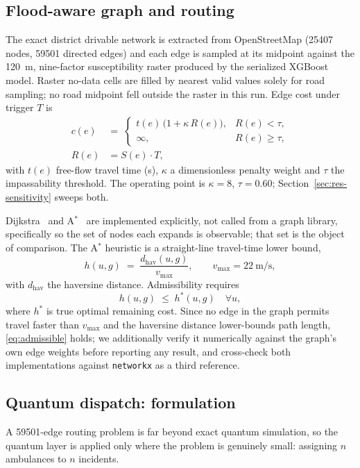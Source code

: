 \documentclass[10pt,twocolumn]{article}
\begin{document}
\subsection{Flood-aware graph and routing}
\label{sec:method-routing}
The exact district drivable network is extracted from OpenStreetMap
(\num{25407} nodes, \num{59501} directed edges) and each edge is sampled at its
midpoint against the \SI{120}{\metre}, nine-factor susceptibility raster
produced by the serialized XGBoost model. Raster no-data cells are filled by
nearest valid values solely for road sampling; no road midpoint fell outside the
raster in this run. Edge cost
under trigger $T$ is
\begin{align}
c(e) \;&=\;
\begin{cases}
t(e)\,\bigl(1+\kappa\,R(e)\bigr), & R(e) < \tau,\\[2pt]
\infty, & R(e) \ge \tau,
\end{cases} \nonumber\\[2pt]
R(e) &= S(e)\cdot T,
\label{eq:edgecost}
\end{align}
with $t(e)$ free-flow travel time (\si{\second}), $\kappa$ a dimensionless
penalty weight and $\tau$ the impassability threshold. The operating point is
$\kappa=8$, $\tau=0.60$; Section~\ref{sec:res-sensitivity} sweeps both.

Dijkstra~\citep{dijkstra1959} and A$^\ast$~\citep{hart1968} are implemented
explicitly, not called from a graph library, specifically so the set of
nodes each expands is observable; that set is the object of comparison. The
A$^\ast$ heuristic is a straight-line travel-time lower bound,
\begin{equation}
h(u,g) \;=\; \frac{d_{\mathrm{hav}}(u,g)}{v_{\max}},
\qquad v_{\max}=\SI{22}{\metre\per\second},
\label{eq:heuristic}
\end{equation}
with $d_{\mathrm{hav}}$ the haversine distance. Admissibility requires
\begin{equation}
h(u,g) \;\le\; h^{*}(u,g) \quad \forall u,
\label{eq:admissible}
\end{equation}
where $h^{*}$ is true optimal remaining cost. Since no edge in the graph permits
travel faster than $v_{\max}$ and the haversine distance lower-bounds path
length, \eqref{eq:admissible} holds; we additionally verify it numerically
against the graph's own edge weights before reporting any result, and cross-check
both implementations against \texttt{networkx} as a third reference.

\subsection{Quantum dispatch: formulation}
\label{sec:method-qaoa}
A \num{59501}-edge routing problem is far beyond exact quantum simulation, so the
quantum layer is applied only where the problem is genuinely small: assigning
$n$ ambulances to $n$ incidents.
\end{document}
